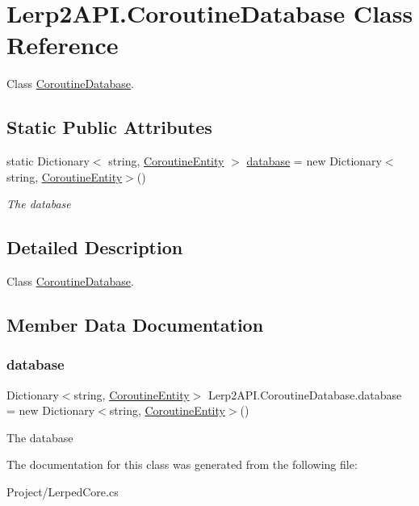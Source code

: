 \hypertarget{class_lerp2_a_p_i_1_1_coroutine_database}{}\section{Lerp2\+A\+P\+I.\+Coroutine\+Database Class Reference}
\label{class_lerp2_a_p_i_1_1_coroutine_database}


Class \hyperlink{class_lerp2_a_p_i_1_1_coroutine_database}{Coroutine\+Database}.  


\subsection*{Static Public Attributes}
\begin{DoxyCompactItemize}
\item 
static Dictionary$<$ string, \hyperlink{class_lerp2_a_p_i_1_1_coroutine_entity}{Coroutine\+Entity} $>$ \hyperlink{class_lerp2_a_p_i_1_1_coroutine_database_ac805340e0b44a86b2b4265c553ca8b76}{database} = new Dictionary$<$string, \hyperlink{class_lerp2_a_p_i_1_1_coroutine_entity}{Coroutine\+Entity}$>$()
\begin{DoxyCompactList}\small\item\em The database \end{DoxyCompactList}\end{DoxyCompactItemize}


\subsection{Detailed Description}
Class \hyperlink{class_lerp2_a_p_i_1_1_coroutine_database}{Coroutine\+Database}. 



\subsection{Member Data Documentation}
\mbox{\label{class_lerp2_a_p_i_1_1_coroutine_database_ac805340e0b44a86b2b4265c553ca8b76}} 
\subsubsection{\texorpdfstring{database}{database}}
{\footnotesize\ttfamily Dictionary$<$string, \hyperlink{class_lerp2_a_p_i_1_1_coroutine_entity}{Coroutine\+Entity}$>$ Lerp2\+A\+P\+I.\+Coroutine\+Database.\+database = new Dictionary$<$string, \hyperlink{class_lerp2_a_p_i_1_1_coroutine_entity}{Coroutine\+Entity}$>$()\hspace{0.3cm}{\ttfamily [static]}}



The database 



The documentation for this class was generated from the following file\+:\begin{DoxyCompactItemize}
\item 
Project/Lerped\+Core.\+cs\end{DoxyCompactItemize}

